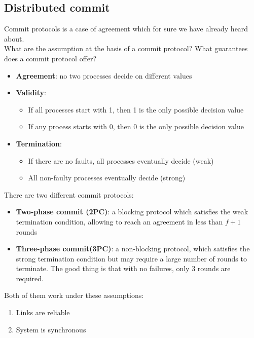 \documentclass[10pt,a4paper]{article}
\begin{document}
\subsection{Distributed commit}
Commit protocols is a case of agreement which for sure we have already heard about. \\ What are the assumption at the basis of a commit protocol? What guarantees does a commit protocol offer?
\begin{itemize}
	\item \textbf{Agreement}: no two processes decide on different values
	\item \textbf{Validity}:
	\begin{itemize}
		\item If all processes start with 1, then 1 is the only possible decision value
		\item If any process starts with 0, then 0 is the only possible decision value
	\end{itemize}
	\item \textbf{Termination}:
	\begin{itemize}
		\item If there are no faults, all processes eventually decide (weak)
		\item All non-faulty processes eventually decide (strong)
	\end{itemize}
\end{itemize}
There are two different commit protocols:
\begin{itemize}
	\item \textbf{Two-phase commit (2PC)}: a blocking protocol which satisfies the weak termination condition, allowing to reach an agreement in less than $f+1$ rounds
	\item \textbf{Three-phase commit(3PC)}: a non-blocking protocol, which satisfies the strong termination condition but may require a large number of rounds to terminate. The good thing is that with no failures, only 3 rounds are required.
\end{itemize}
Both of them work under these assumptions:
\begin{enumerate}
	\item Links are reliable
	\item System is synchronous
\end{enumerate} \pagebreak
\end{document}
